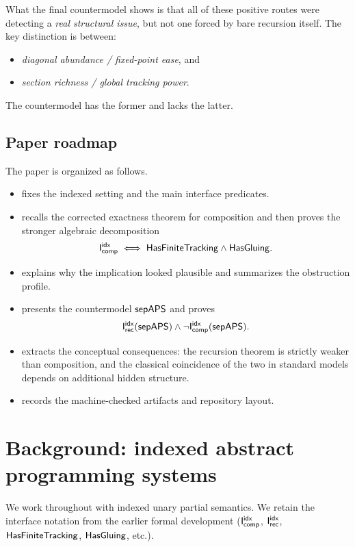 \documentclass[11pt]{article}
\begin{document}
What the final countermodel shows is that all of these positive routes were detecting a \emph{real structural issue}, but not one forced by bare recursion itself.  The key distinction is between:

\begin{itemize}[leftmargin=2em]
\item \emph{diagonal abundance / fixed-point ease}, and
\item \emph{section richness / global tracking power}.
\end{itemize}

The countermodel has the former and lacks the latter.

\subsection{Paper roadmap}

The paper is organized as follows.

\begin{itemize}[leftmargin=2em]
\item {} fixes the indexed setting and the main interface predicates.
\item {} recalls the corrected exactness theorem for composition and then proves the stronger algebraic decomposition
\[
\mathsf{I}_{\mathsf{comp}}^{\mathsf{idx}} \iff \mathsf{HasFiniteTracking} \wedge \mathsf{HasGluing}.
\]
\item {} explains why the implication looked plausible and summarizes the obstruction profile.
\item {} presents the countermodel \(\mathsf{sepAPS}\) and proves
\[
\mathsf{I}_{\mathsf{rec}}^{\mathsf{idx}}(\mathsf{sepAPS}) \wedge \neg \mathsf{I}_{\mathsf{comp}}^{\mathsf{idx}}(\mathsf{sepAPS}).
\]
\item {} extracts the conceptual consequences: the recursion theorem is strictly weaker than composition, and the classical coincidence of the two in standard models depends on additional hidden structure.
\item {} records the machine-checked artifacts and repository layout.
\end{itemize}

\section{Background: indexed abstract programming systems}\label{sec:background}

We work throughout with indexed unary partial semantics.  We retain the interface notation from the earlier formal development (\(\mathsf{I}_{\mathsf{comp}}^{\mathsf{idx}}\), \(\mathsf{I}_{\mathsf{rec}}^{\mathsf{idx}}\), \(\mathsf{HasFiniteTracking}\), \(\mathsf{HasGluing}\), etc.).
\end{document}
